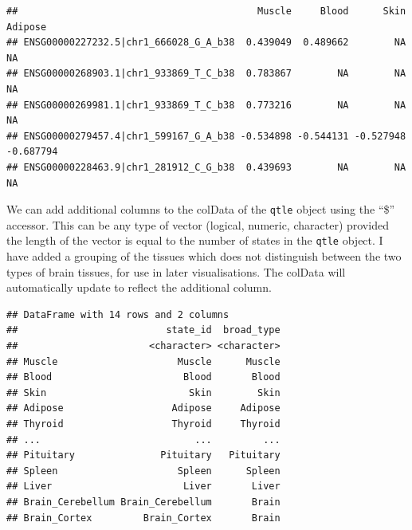 \documentclass[
]{article}
\newenvironment{Shaded}{\begin{snugshade}}{\end{snugshade}}
\newcommand{\FunctionTok}[1]{\textcolor[rgb]{0.13,0.29,0.53}{\textbf{#1}}}
\newcommand{\NormalTok}[1]{#1}
\newcommand{\OtherTok}[1]{\textcolor[rgb]{0.56,0.35,0.01}{#1}}
\newcommand{\SpecialCharTok}[1]{\textcolor[rgb]{0.81,0.36,0.00}{\textbf{#1}}}
\newcommand{\StringTok}[1]{\textcolor[rgb]{0.31,0.60,0.02}{#1}}
\begin{document}
\begin{verbatim}
##                                          Muscle     Blood      Skin   Adipose
## ENSG00000227232.5|chr1_666028_G_A_b38  0.439049  0.489662        NA        NA
## ENSG00000268903.1|chr1_933869_T_C_b38  0.783867        NA        NA        NA
## ENSG00000269981.1|chr1_933869_T_C_b38  0.773216        NA        NA        NA
## ENSG00000279457.4|chr1_599167_G_A_b38 -0.534898 -0.544131 -0.527948 -0.687794
## ENSG00000228463.9|chr1_281912_C_G_b38  0.439693        NA        NA        NA
\end{verbatim}

\normalsize

We can add additional columns to the colData of the \texttt{qtle} object
using the ``\$'' accessor. This can be any type of vector (logical,
numeric, character) provided the length of the vector is equal to the
number of states in the \texttt{qtle} object. I have added a grouping of
the tissues which does not distinguish between the two types of brain
tissues, for use in later visualisations. The colData will automatically
update to reflect the additional column.

\footnotesize

\begin{Shaded}
\end{Shaded}

\begin{verbatim}
## DataFrame with 14 rows and 2 columns
##                          state_id  broad_type
##                       <character> <character>
## Muscle                     Muscle      Muscle
## Blood                       Blood       Blood
## Skin                         Skin        Skin
## Adipose                   Adipose     Adipose
## Thyroid                   Thyroid     Thyroid
## ...                           ...         ...
## Pituitary               Pituitary   Pituitary
## Spleen                     Spleen      Spleen
## Liver                       Liver       Liver
## Brain_Cerebellum Brain_Cerebellum       Brain
## Brain_Cortex         Brain_Cortex       Brain
\end{verbatim}
\end{document}
